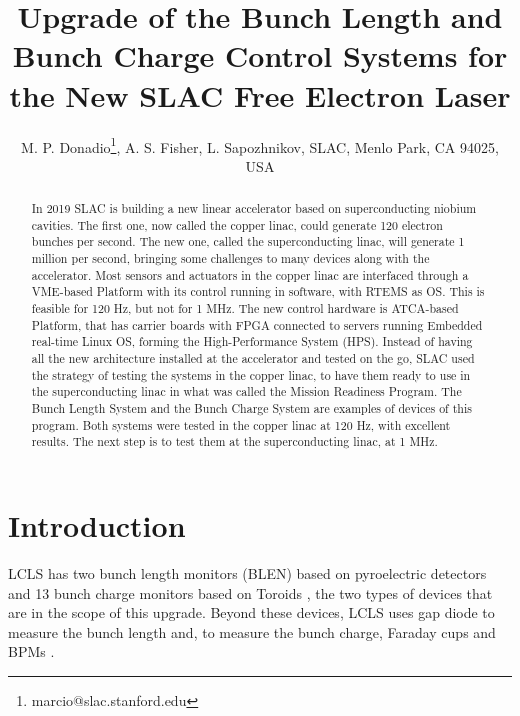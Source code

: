 \documentclass[letter,
        biblatex,   %
        keeplastbox,  %
        ]{jacow}
\begin{document}
\title{Upgrade of the Bunch Length and Bunch Charge Control Systems for the New SLAC Free Electron Laser}

\author{M. P. Donadio\thanks{marcio@slac.stanford.edu}, A. S. Fisher, L. Sapozhnikov, SLAC, Menlo Park, CA 94025, USA}
	
\maketitle


\begin{abstract}
In 2019 SLAC is building a new linear accelerator based on superconducting niobium cavities. The first one, now called the copper linac, could generate 120 electron bunches per second. The new one, called the superconducting linac, will generate 1 million per second, bringing some challenges to many devices along with the accelerator. Most sensors and actuators in the copper linac are interfaced through a VME-based Platform with its control running in software, with RTEMS as OS. This is feasible for 120 Hz, but not for 1 MHz. The new control hardware is ATCA-based Platform, that has carrier boards with FPGA connected to servers running Embedded real-time Linux OS, forming the High-Performance System (HPS). Instead of having all the new architecture installed at the accelerator and tested on the go, SLAC used the strategy of testing the systems in the copper linac, to have them ready to use in the superconducting linac in what was called the Mission Readiness Program. The Bunch Length System and the Bunch Charge System are examples of devices of this program. Both systems were tested in the copper linac at 120 Hz, with excellent results. The next step is to test them at the superconducting linac, at 1 MHz.
\end{abstract}


\section{Introduction}
LCLS has two bunch length monitors (BLEN) based on pyroelectric detectors \cite{blen-pac07} and 13 bunch charge monitors based on Toroids \cite{slac-toroids}, the two types of devices that are in the scope of this upgrade. Beyond these devices, LCLS uses gap diode to measure the bunch length \cite{injector-commissioning-2007} and, to measure the bunch charge, Faraday cups \cite{slac-toroids} and BPMs \cite{beam-measurement}.
\end{document}
